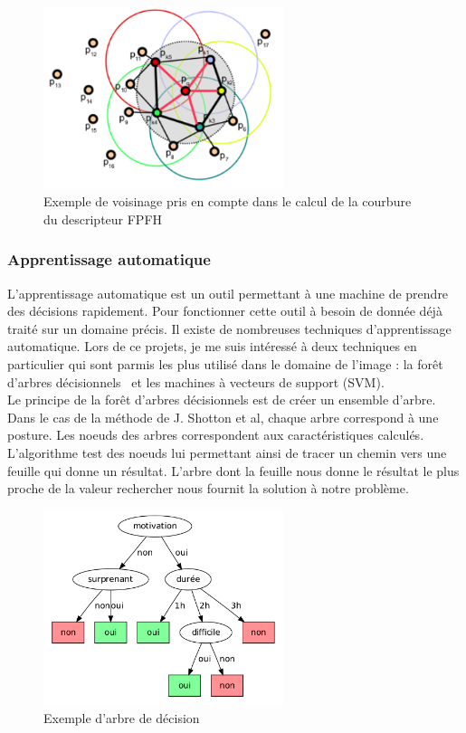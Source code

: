 \begin{figure}[!h]
  \begin{center}
    \includegraphics[width=7cm]{image/FPFH.png}
    \caption{Exemple de voisinage pris en compte dans le calcul de la courbure du descripteur FPFH}
    \label{fig:fpfhNeighborhood}
  \end{center}
\end{figure}
 
\subsubsection{Apprentissage automatique}
L'apprentissage automatique est un outil permettant à une machine de prendre des décisions rapidement.
Pour fonctionner cette outil à besoin de donnée déjà traité sur un domaine précis. Il existe de nombreuses
techniques d'apprentissage automatique. Lors de ce projets, je me suis intéressé à deux techniques en 
particulier qui sont parmis les plus utilisé dans le domaine de l'image : la \og forêt d'arbres décisionnels \fg \ et les
\og machines à vecteurs de support \fg (SVM).\\

Le principe de la forêt d'arbres décisionnels\cite{randomDecisionForest} est de créer un ensemble d'arbre.
Dans le cas de la méthode de J. Shotton et al\cite{kinectSegmentation}, chaque arbre correspond à une posture.
Les noeuds des arbres correspondent aux caractéristiques calculés. L'algorithme test des noeuds lui permettant ainsi de tracer un
chemin vers une feuille qui donne un résultat. L'arbre dont la feuille nous donne le résultat le plus proche 
de la valeur rechercher nous fournit la solution à notre problème.\\

\begin{figure}[!h]
  \begin{center}
    \includegraphics[width=7cm]{image/randomForest.png}
    \caption{Exemple d'arbre de décision}
  \end{center}
\end{figure}

